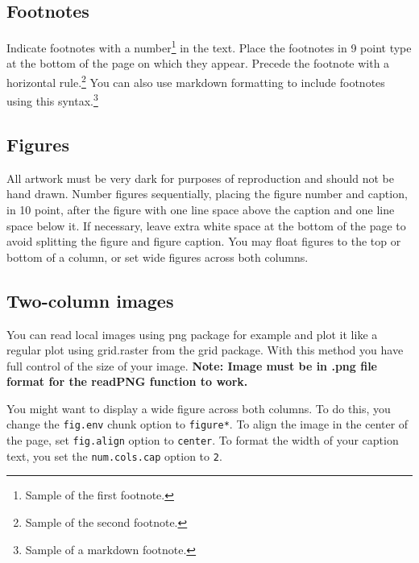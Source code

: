\documentclass[10pt, letterpaper]{article}
\begin{document}
\hypertarget{footnotes}{%
\subsection{Footnotes}\label{footnotes}}

Indicate footnotes with a number\footnote{Sample of the first
footnote.} in the text. Place the footnotes in 9 point type at the
bottom of the page on which they appear. Precede the footnote with a
horizontal rule.\footnote{Sample of the second footnote.} You can also
use markdown formatting to include footnotes using this
syntax.\footnote{Sample of a markdown footnote.}

\hypertarget{figures}{%
\subsection{Figures}\label{figures}}

All artwork must be very dark for purposes of reproduction and should
not be hand drawn. Number figures sequentially, placing the figure
number and caption, in 10 point, after the figure with one line space
above the caption and one line space below it. If necessary, leave extra
white space at the bottom of the page to avoid splitting the figure and
figure caption. You may float figures to the top or bottom of a column,
or set wide figures across both columns.

\hypertarget{two-column-images}{%
\subsection{Two-column images}\label{two-column-images}}

You can read local images using png package for example and plot it like
a regular plot using grid.raster from the grid package. With this method
you have full control of the size of your image. \textbf{Note: Image
must be in .png file format for the readPNG function to work.}

You might want to display a wide figure across both columns. To do this,
you change the \texttt{fig.env} chunk option to \texttt{figure*}. To
align the image in the center of the page, set \texttt{fig.align} option
to \texttt{center}. To format the width of your caption text, you set
the \texttt{num.cols.cap} option to \texttt{2}.
\end{document}
